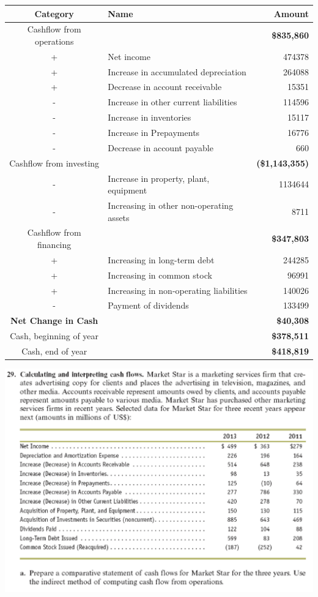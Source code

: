 \documentclass[
  a4paper,
  DIV=11,
  numbers=noendperiod]{scrreprt}
\begin{document}
\begin{longtable}[]{@{}clr@{}}
\toprule\noalign{}
Category & Name & Amount \\
\midrule\noalign{}
\endhead
\bottomrule\noalign{}
\endlastfoot
Cashflow from operations & & \textbf{\$835,860} \\
+ & Net income & 474378 \\
+ & Increase in accumulated depreciation & 264088 \\
+ & Decrease in account receivable & 15351 \\
- & Increase in other current liabilities & 114596 \\
- & Increase in inventories & 15117 \\
- & Increase in Prepayments & 16776 \\
- & Decrease in account payable & 660 \\
Cashflow from investing & & \textbf{(\$1,143,355)} \\
- & Increase in property, plant, equipment & 1134644 \\
- & Increasing in other non-operating assets & 8711 \\
Cashflow from financing & & \textbf{\$347,803} \\
+ & Increasing in long-term debt & 244285 \\
+ & Increasing in common stock & 96991 \\
+ & Increasing in non-operating liabilities & 140026 \\
- & Payment of dividends & 133499 \\
\textbf{Net Change in Cash} & & \textbf{\$40,308} \\
Cash, beginning of year & & \textbf{\$378,511} \\
Cash, end of year & & \textbf{\$418,819} \\
\end{longtable}

\includegraphics{images/재무회계_6-29.png}
\end{document}
